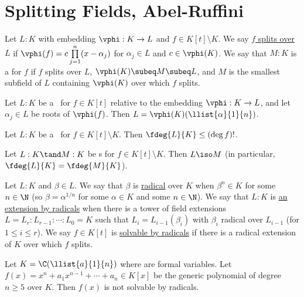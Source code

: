 \documentclass[a4paper]{article}
\begin{document}
\section{Splitting Fields, Abel-Ruffini}
\begin{tdefinition}
  Let \( L:K \) with embedding \( \vphi:K\to L \) and \( f\in K[t]\setminus K \).
  We say \ul{\( f \) splits over \( L \)} if \( \vphi(f) = c\prod\limits_{j=1}^n (x-\alpha_j) \) for \( \alpha_j \in L \) and \( c\in \vphi(K) \).
  We say that \( M:K \) is a \ul{\sfe} for \( f \) if \( f \) splits over \( L \), \( \vphi(K)\subeq M\subeq L \), and \( M \) is the smallest subfield of \( L \) containing \( \vphi(K) \) over which \( f \) splits.
\end{tdefinition}

\begin{tlemma}
  Let \( L:K \) be a \sfe~for \( f\in K[t] \) relative to the embedding \( \vphi:K\to L \), and let \( \alpha_j\in L \) be roots of \( \vphi(f) \).
  Then \( L=\vphi(K)(\llist{\alpha}{1}{n}) \).
\end{tlemma}

\begin{tlemma}
  Let \( L:K \) be a \sfe~for \( f\in K[t]\setminus K \).
  Then \( \fdeg{L}{K}\leq (\deg f)! \).
\end{tlemma}

\begin{tlemma}
  Let \( L:K \tand M:K \) be  \sfe s for \( f\in K[t]\setminus K \).
  Then \( L\iso M \) (in particular, \( \fdeg{L}{K}=\fdeg{M}{K} \)).
\end{tlemma}

\begin{tdefinition}
  Let \( L:K \) and \( \beta \in L \).
  We say that \( \beta \) is \ul{radical} over \( K \) when \( \beta^n \in K \) for some \( n \in \N \) (so \( \beta = \alpha^{1/n} \) for some \( \alpha \in K \) and some \( n \in \N \)).
  We say that \( L:K \) is \ul{an extension by radicals} when there is a tower of field extensions \( L = L_r : L_{r-1} : \cdots : L_0 = K \) such that \( L_i = L_{i-1}(\beta_i) \) with \( \beta_i \) radical over \( L_{i-1} \) (for \( 1 \leq i \leq r \)).
  We say \( f \in K[t] \) is \ul{solvable by radicals} if there is a radical extension of \( K \) over which \( f \) splits.
\end{tdefinition}

\begin{ttheorem}
  Let \( K=\C(\llist{a}{1}{n}) \) where  are formal variables.
  Let \( f(x) = x^n+a_1x^{n-1}+\cdots+a_n \in K[x] \) be the generic polynomial of degree \( n\geq 5 \) over \( K \).
  Then \( f(x) \) is not solvable by radicals.
\end{ttheorem}
\end{document}
